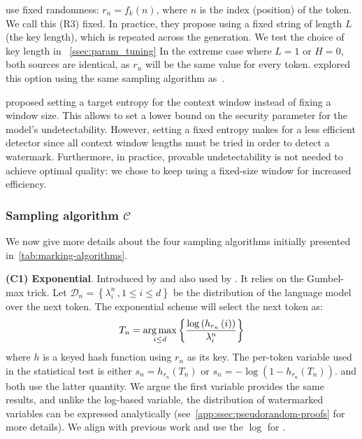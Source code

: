 \citet{kuditipudi_robust_2023} use fixed randomness:
$r_n = f_k(n)$, where $n$ is the index (position) of the token.
We call this (R3) fixed.
%
In practice, they propose using a fixed string of length $L$ (the key length), which is repeated across the generation.
%
We test the choice of key length in ~\cref{ssec:param_tuning}
%
In the extreme case where $L=1$ or $H=0$, both sources are identical, as $r_n$ will be the same value for every token. \citet{zhao2023provable} explored this option using the same sampling algorithm as~\citet{kirchenbauer_watermark_2023}.

\label{ssec:binary}
\citet{christ_undetectable_2023} proposed setting a target entropy for the context window instead of fixing a window size.
%
This allows to set a lower bound on the security parameter for the model's undetectability.
%
However, setting a fixed entropy makes for a less efficient detector since all context window lengths must be tried in order to detect a watermark.
%
Furthermore, in practice, provable undetectability is not needed to achieve optimal quality: we chose to keep using a fixed-size window for increased efficiency.

\subsubsection{Sampling algorithm \(\mathcal{C}\)}\label{ssec:sampling}
%
\noindent
We now give more details about the four sampling algorithms initially presented in~\cref{tab:marking-algorithms}.

\smallskip\noindent\textbf{(C1) Exponential}.
%
Introduced by \citet{aaronson_watermarking_2022} and also used by \citet{kuditipudi_robust_2023}. It relies on the Gumbel-max trick.
%
Let $\mathcal{D}_n = \left\{\lambda^n_i\,, 1 \leq i \leq d\right\}$ be the distribution of the language model over the next token. %
%
The exponential scheme will select the next token as:
\begin{align}
    T_{n} = \operatorname*{arg\,max}\limits_{i \leq d}\left\{ \frac{\log \left( h_{r_n}\left( i \right) \right)}{\lambda^n_i} \right\}
\end{align}
where $h$ is a keyed hash function using $r_n$ as its key.
%
The per-token variable used in the statistical test is either $s_n = h_{r_n}(T_n)$ or $s_n = -\log \left( 1-h_{r_n}(T_n)\right)$.
%
\citet{aaronson_watermarking_2022} and \citet{kuditipudi_robust_2023} both use the latter quantity.
%
We argue the first variable provides the same results, and unlike the log-based variable, the distribution of watermarked variables can be expressed analytically (see~\cref{app:ssec:pseudorandom-proofs} for more details).
%
We align with previous work and use the $\log$ for \benchmarkname{}.

